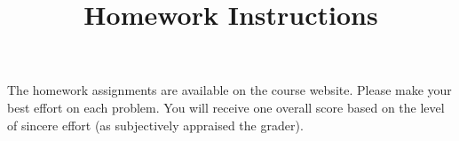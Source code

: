\documentclass[12pt]{article}
\begin{document}
\date{\vspace{-5ex}}

\title{Homework Instructions}

\maketitle

\noindent
The homework assignments are available on the course website.  Please
make your best effort on each problem.  You will receive one overall
score based on the level of sincere effort (as subjectively appraised
the grader). \\
\end{document}
